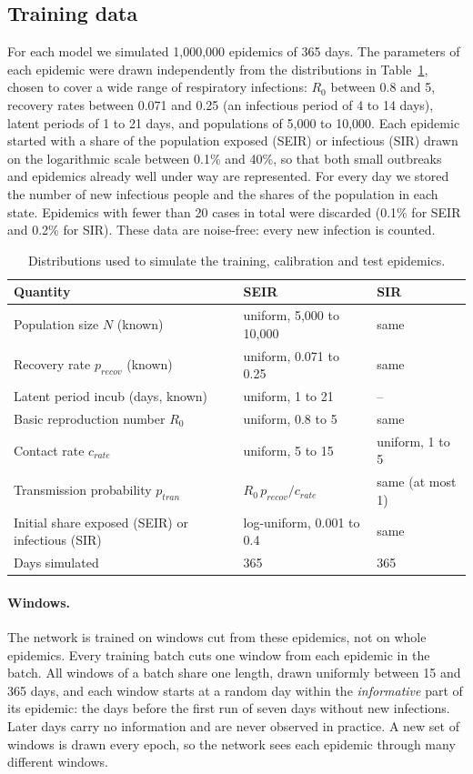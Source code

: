 \documentclass[12pt]{article}
\begin{document}
\subsection{Training data}\label{sec:training-data}

For each model we simulated 1,000,000 epidemics of 365 days. The parameters of each epidemic were
drawn independently from the distributions in Table~\ref{tab:priors}, chosen to cover a wide range
of respiratory infections: $R_0$ between 0.8 and 5, recovery rates between 0.071 and 0.25 (an
infectious period of 4 to 14 days), latent periods of 1 to 21 days, and populations of 5,000 to
10,000. Each epidemic started with a share of the population exposed (SEIR) or infectious (SIR)
drawn on the logarithmic scale between 0.1\% and 40\%, so that both small outbreaks and epidemics
already well under way are represented. For every day we stored the number of new infectious people
and the shares of the population in each state. Epidemics with fewer than 20 cases in total were
discarded (0.1\% for SEIR and 0.2\% for SIR). These data are noise-free: every new infection is
counted.

\begin{table}[htbp]
\centering
\caption{Distributions used to simulate the training, calibration and test epidemics.}
\label{tab:priors}
\small
\begin{tabular}{lll}
\toprule
Quantity & SEIR & SIR \\
\midrule
Population size $N$ (known) & uniform, 5,000 to 10,000 & same \\
Recovery rate $p_{recov}$ (known) & uniform, 0.071 to 0.25 & same \\
Latent period incub (days, known) & uniform, 1 to 21 & -- \\
Basic reproduction number $R_0$ & uniform, 0.8 to 5 & same \\
Contact rate $c_{rate}$ & uniform, 5 to 15 & uniform, 1 to 5 \\
Transmission probability $p_{tran}$ & $R_0\,p_{recov}/c_{rate}$ & same (at most 1) \\
Initial share exposed (SEIR) or infectious (SIR) & log-uniform, 0.001 to 0.4 & same \\
Days simulated & 365 & 365 \\
\bottomrule
\end{tabular}
\end{table}

\paragraph{Windows.} The network is trained on windows cut from these epidemics, not on whole
epidemics. Every training batch cuts one window from each epidemic in the batch. All windows of a
batch share one length, drawn uniformly between 15 and 365 days, and each window starts at a random
day within the \emph{informative} part of its epidemic: the days before the first run of seven days
without new infections. Later days carry no information and are never observed in practice. A new set
of windows is drawn every epoch, so the network sees each epidemic through many different windows.
\end{document}
